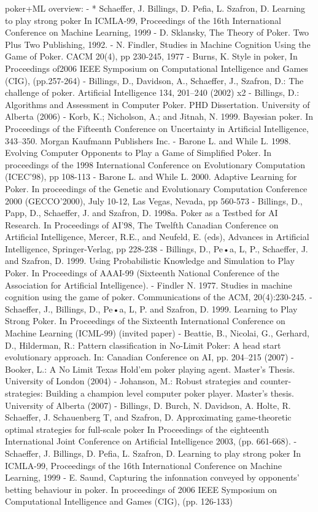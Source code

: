 poker+ML overview:
- * Schaeffer, J. Billings, D. Pefia, L. Szafron, D. Learning to play strong
poker In ICMLA-99, Proceedings of the 16th International Conference
on Machine Learning, 1999
- D. Sklansky, The Theory of Poker. Two Plus Two Publishing, 1992.
- N. Findler, Studies in Machine Cognition Using the Game of Poker.
CACM 20(4), pp 230-245, 1977
- Burns, K. Style in poker, In Proceedings of2006 IEEE Symposium on
Computational Intelligence and Games (CIG), (pp.257-264)
- Billings, D., Davidson, A., Schaeffer, J., Szafron, D.: The challenge of poker. Artificial Intelligence
134, 201–240 (2002) x2
- Billings, D.: Algorithms and Assessment in Computer Poker. PHD Dissertation. University
of Alberta (2006)
- Korb, K.; Nicholson, A.; and Jitnah, N. 1999. Bayesian
poker. In Proceedings of the Fifteenth Conference on Uncertainty
in Artificial Intelligence, 343–350. Morgan Kaufmann
Publishers Inc.
- Barone L. and While L. 1998. Evolving Computer Opponents to Play a Game of Simplified
Poker. In proceedings of the 1998 International Conference on Evolutionary Computation
(ICEC’98), pp 108-113
- Barone L. and While L. 2000. Adaptive Learning for Poker. In proceedings of the Genetic and
Evolutionary Computation Conference 2000 (GECCO’2000), July 10-12, Las Vegas,
Nevada, pp 560-573
- Billings, D., Papp, D., Schaeffer, J. and Szafron, D. 1998a. Poker as a Testbed for AI Research.
In Proceedings of AI’98, The Twelfth Canadian Conference on Artificial Intelligence,
Mercer, R.E., and Neufeld, E. (eds), Advances in Artificial Intelligence, Springer-Verlag, pp
228-238
- Billings, D., Pe•a, L, P., Schaeffer, J. and Szafron, D. 1999. Using Probabilistic Knowledge
and Simulation to Play Poker. In Proceedings of AAAI-99 (Sixteenth National Conference
of the Association for Artificial Intelligence).
- Findler N. 1977. Studies in machine cognition using the game of poker. Communications of
the ACM, 20(4):230-245.
- Schaeffer, J., Billings, D., Pe•a, L, P. and Szafron, D. 1999. Learning to Play Strong Poker. In
Proceedings of the Sixteenth International Conference on Machine Learning (ICML-99)
(invited paper)
- Beattie, B., Nicolai, G., Gerhard, D., Hilderman, R.: Pattern classification in No-Limit Poker:
A head start evolutionary approach. In: Canadian Conference on AI, pp. 204–215 (2007)
- Booker, L.: A No Limit Texas Hold’em poker playing agent. Master’s Thesis. University of
London (2004)
- Johanson, M.: Robust strategies and counter-strategies: Building a champion level computer
poker player. Master’s thesis. University of Alberta (2007)
- Billings, D. Burch, N. Davidson, A. Holte, R. Schaeffer, J. Schauenberg
T, and Szafron, D. Approximating game-theoretic optimal strategies for
full-scale poker In Proceedings of the eighteenth International Joint
Conference on Artificial Intelligence 2003, (pp. 661-668).
- Schaeffer, J. Billings, D. Pefia, L. Szafron, D. Learning to play strong
poker In ICMLA-99, Proceedings of the 16th International Conference
on Machine Learning, 1999
- E. Saund, Capturing the infonnation conveyed by opponents' betting
behaviour in poker. In proceedings of 2006 IEEE Symposium on
Computational Intelligence and Games (CIG), (pp. 126-133)

